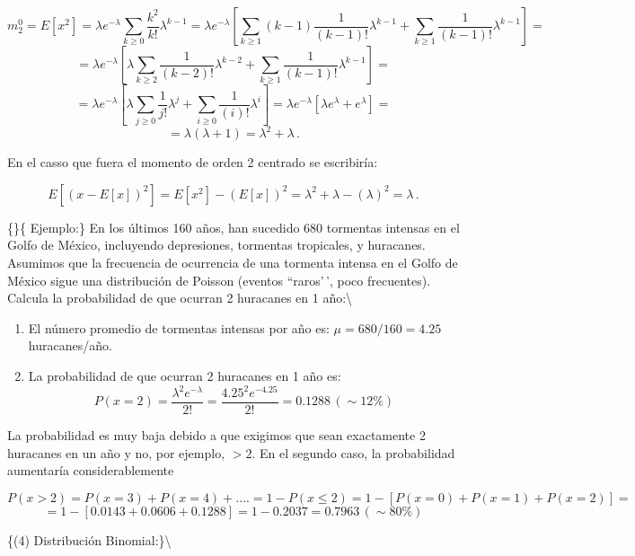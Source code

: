 \documentclass[
]{agujournal2019}
\begin{document}
\[m^0_2=E[x^2]=\lambda e^{-\lambda}\sum_{k \ge 0}\frac{k^2}{k!}\lambda^{k-1}=
               \lambda e^{-\lambda}\left[ \sum_{k \ge 1}(k-1)\frac{1}{(k-1)!}\lambda^{k-1} +
                                      \sum_{k \ge 1} \frac{1} {(k-1)!} \lambda^{k-1} \right]=\]
\[= \lambda e^{-\lambda}\left[ \lambda \sum_{k \ge 2}\frac{1}{(k-2)!}\lambda^{k-2} +
                                         \sum_{k \ge 1}\frac{1}{(k-1)!}\lambda^{k-1}\right]=\]
\[= \lambda e^{-\lambda}\left[ \lambda \sum_{j \ge 0}\frac{1}{j!}\lambda^{j} +
                                         \sum_{i \ge 0}\frac{1}{(i)!}\lambda^{i}\right]=
                         \lambda e^{-\lambda} \left[\lambda e^{\lambda} + e^{\lambda}\right]=\]
\[=\lambda (\lambda +1)=\lambda^2 + \lambda\,.\]

En el casso que fuera el momento de orden 2 centrado se escribiría:

\[E[(x-E[x])^2]=E[x^2]-(E[x])^2=\lambda^2 + \lambda - (\lambda)^2=\lambda\,.\]

\vspace{0.25cm}

\{\noindent\}\{ Ejemplo:\} En los últimos 160 años, han sucedido 680
tormentas intensas en el Golfo de México, incluyendo depresiones,
tormentas tropicales, y huracanes. Asumimos que la frecuencia de
ocurrencia de una tormenta intensa en el Golfo de México sigue una
distribución de Poisson (eventos ``raros'\,', poco frecuentes). Calcula
la probabilidad de que ocurran 2 huracanes en 1 año:\textbackslash{}

\begin{enumerate}
\def\labelenumi{(\alph{enumi})}
\item
  El número promedio de tormentas intensas por año es:
  \(\mu=680/160=4.25\) huracanes/año.
\item
  La probabilidad de que ocurran 2 huracanes en 1 año es:
  \[P(x=2)=\frac{{\lambda}^2 e^{-\lambda}}{2!}=\frac{{4.25}^2 e^{-4.25}}{2!}=0.1288\,(\sim12\%)\]
\end{enumerate}

La probabilidad es muy baja debido a que exigimos que sean exactamente 2
huracanes en un año y no, por ejemplo, \(>2\). En el segundo caso, la
probabilidad aumentaría considerablemente

\[P(x>2)=P(x=3)+P(x=4)+....=1-P(x\le 2)=1-[P(x=0)+P(x=1)+P(x=2)]=\]
\[=1-[0.0143+0.0606+0.1288]=1-0.2037=0.7963\,(\sim80\%)\]

\vspace{0.5cm}

\{\noindent  (4) Distribución Binomial:\}\textbackslash{}
\end{document}
